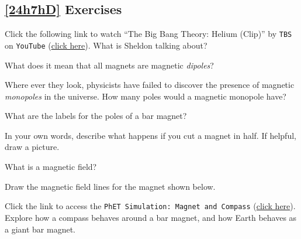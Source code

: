 \documentclass{article}
\numberwithin{equation}{section}
\numberwithin{figure}{section}
\begin{document}
\subsection*{\ref{24h7hD} Exercises}

\begin{exercise}
    Click the following link to watch ``The Big Bang Theory: Helium (Clip)'' by \texttt{TBS} on \texttt{YouTube} (\href{https://youtu.be/Q6Z0pCax9b8}{click here}). What is Sheldon talking about?
\end{exercise}

\begin{exercise}
    What does it mean that all magnets are magnetic \textit{dipoles}?
\end{exercise}

\begin{exercise}
    Where ever they look, physicists have failed to discover the presence of magnetic \textit{monopoles} in the universe. How many poles would a magnetic monopole have?
\end{exercise}

\begin{exercise}
    What are the labels for the poles of a bar magnet?
\end{exercise}


\begin{exercise}
    In your own words, describe what happens if you cut a magnet in half. If helpful, draw a picture.
\end{exercise}

\begin{exercise}
    What is a magnetic field?
\end{exercise}

\begin{exercise}
    Draw the magnetic field lines for the magnet shown below.

\begin{center}
\end{center}
\end{exercise}

\begin{exercise}
    Click the link to access the \texttt{PhET Simulation: Magnet and Compass} (\href{https://phet.colorado.edu/en/simulations/magnet-and-compass}{click here}). Explore how a compass behaves around a bar magnet, and how Earth behaves as a giant bar magnet.
\end{exercise}
\end{document}
